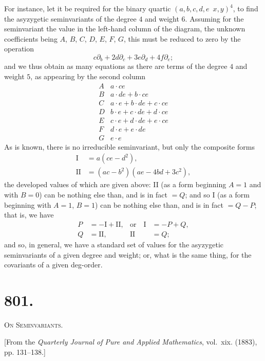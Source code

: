 \documentclass[11pt,a4paper]{book}
\begin{document}
For instance, let it be required for the binary quartic $(a, b, c, d, e \!\!\!\! \,\,\, x, y)^4$, to find the asyzygetic seminvariants of the degree $4$ and weight $6$. Assuming for the seminvariant the value in the left-hand column of the diagram, the unknown coefficients being $A$, $B$, $C$, $D$, $E$, $F$, $G$, this must be reduced to zero by the operation
\[
c\partial_b + 2d\partial_c + 3e\partial_d + 4f\partial_e;
\]
and we thus obtain as many equations as there are terms of the degree $4$ and weight $5$, as appearing by the second column
\[
\begin{array}{r|l}
A & a \cdot ce \\
B & a \cdot de + b \cdot ce \\
C & a \cdot e + b \cdot de + c \cdot ce \\
D & b \cdot e + c \cdot de + d \cdot ce \\
E & c \cdot e + d \cdot de + e \cdot ce \\
F & d \cdot e + e \cdot de \\
G & e \cdot e
\end{array}
\]
As is known, there is no irreducible seminvariant, but only the composite forms
\[
\begin{aligned}
\text{I} &= a(ce - d^2), \\
\text{II} &= (ac - b^2)(ae - 4bd + 3c^2),
\end{aligned}
\]
the developed values of which are given above: II (as a form beginning $A=1$ and with $B=0$) can be nothing else than, and is in fact $=Q$; and so I (as a form beginning with $A=1$, $B=1$) can be nothing else than, and is in fact $=Q-P$; that is, we have
\[
\begin{aligned}
P &= -\text{I} + \text{II}, & \text{or} \quad \text{I} &= -P + Q, \\
Q &= \text{II}, & \text{II} &= Q;
\end{aligned}
\]
and so, in general, we have a standard set of values for the asyzygetic seminvariants of a given degree and weight; or, what is the same thing, for the covariants of a given deg-order.



\newpage
\section*{801.}
\begin{center}
{\large\scshape On Seminvariants.}
\end{center}

\begin{flushright}
\small[From the \textit{Quarterly Journal of Pure and Applied Mathematics}, vol.~xix. (1883),\\
pp. 131--138.]
\end{flushright}
\end{document}
